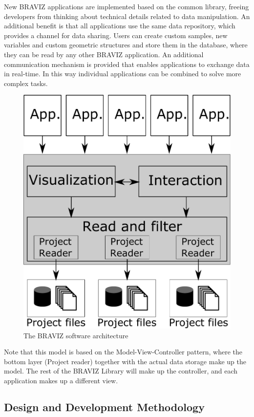 \documentclass[twocolumn]{svjour3}
\begin{document}
New BRAVIZ applications are implemented based on the common library, freeing developers from thinking about technical details related to data manipulation. An additional benefit is that all applications use the same data repository, which provides a channel for data sharing. Users can create custom samples, new variables and custom geometric structures and store them in the database, where they can be read by any other BRAVIZ application. An additional communication mechanism is provided that enables applications to exchange data in real-time. In this way individual applications can be combined to solve more complex tasks.

\begin{figure}
\begin{center}
\includegraphics[width=0.6\linewidth]{arquitecture.pdf}
\end{center}
 \caption{\label{fig_arch} The BRAVIZ software architecture}
\end{figure}

Note that this model is based on the Model-View-Controller pattern, where the bottom layer (Project reader) together with the actual data storage make up the model. The rest of the BRAVIZ Library will make up the controller, and each application makes up a different view.

\subsection{Design and Development Methodology}
\end{document}

